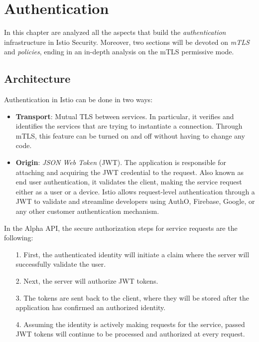 \chapter{Authentication}
In this chapter are analyzed all the aspects that build the \textit{authentication} infrastructure in Istio Security. Moreover, two sections will be devoted on \textit{mTLS} and \textit{policies}, ending in an in-depth analysis on the mTLS permissive mode.
\minitoc

\section{Architecture}
\label{chap:arch}

Authentication in Istio can be done in two ways:

\begin{itemize}
    \item \textbf{Transport}: Mutual TLS between services. In particular, it verifies and identifies the services that are trying to instantiate a connection. Through mTLS, this feature can be turned on and off without having to change any code.
    \item \textbf{Origin}: \textit{JSON Web Token} (JWT). The application is responsible for attaching and acquiring the JWT credential to the request. Also known as end user authentication, it validates the client, making the service request either as a user or a device. Istio allows request-level authentication through a JWT to validate and streamline developers using AuthO, Firebase, Google, or any other customer authentication mechanism.
\end{itemize}

In the Alpha API, the secure authorization steps for service requests are the following:

\begin{itemize}
    \item[1.] First, the authenticated identity will initiate a claim where the server will successfully validate the user.
    \item[2.] Next, the server will authorize JWT tokens.
    \item[3.] The tokens are sent back to the client, where they will be stored after the application has confirmed an authorized identity.
    \item[4.] Assuming the identity is actively making requests for the service, passed JWT tokens will continue to be processed and authorized at every request.
\end{itemize}

